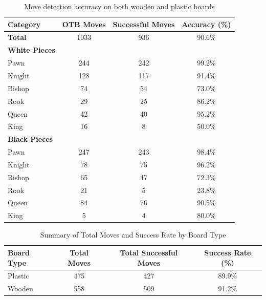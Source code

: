 \begin{table}[htbp]
\centering
\caption{Move detection accuracy on both wooden and plastic boards}
\begin{tabular}{lccc}
\toprule
\textbf{Category} & \textbf{OTB Moves} & \textbf{Successful Moves} & \textbf{Accuracy (\%)} \\
\midrule
\textbf{Total} & 1033 & 936 & 90.6\% \\
\midrule
\textbf{White Pieces} & & & \\
\hspace{1em}Pawn  & 244 & 242 & 99.2\% \\
\hspace{1em}Knight & 128 & 117 & 91.4\% \\
\hspace{1em}Bishop & 74  & 54  & 73.0\% \\
\hspace{1em}Rook   & 29  & 25  & 86.2\% \\
\hspace{1em}Queen  & 42  & 40  & 95.2\% \\
\hspace{1em}King   & 16  & 8   & 50.0\% \\
\midrule
\textbf{Black Pieces} & & & \\
\hspace{1em}Pawn  & 247 & 243 & 98.4\% \\
\hspace{1em}Knight & 78  & 75  & 96.2\% \\
\hspace{1em}Bishop & 65  & 47  & 72.3\% \\
\hspace{1em}Rook   & 21  & 5   & 23.8\% \\
\hspace{1em}Queen  & 84  & 76  & 90.5\% \\
\hspace{1em}King   & 5   & 4   & 80.0\% \\
\bottomrule
\end{tabular}
\end{table}

\begin{table}[htbp]
\centering
\caption{Summary of Total Moves and Success Rate by Board Type}
\begin{tabular}{lccc}
\toprule
\textbf{Board Type} & \textbf{Total Moves} & \textbf{Total Successful Moves} & \textbf{Success Rate (\%)} \\
\midrule
Plastic & 475 & 427 & 89.9\% \\
Wooden  & 558 & 509 & 91.2\% \\
\bottomrule
\end{tabular}
\end{table}


